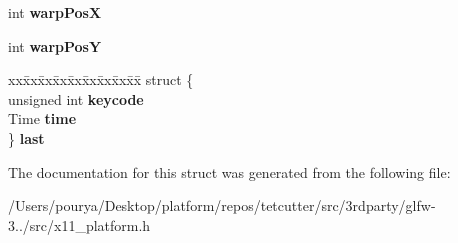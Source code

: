 \begin{DoxyCompactItemize}
\item 
\hypertarget{struct__GLFWwindowX11_ae60bc41921e99dff7972399167d6e5c0}{}int {\bfseries warp\+Pos\+X}\label{struct__GLFWwindowX11_ae60bc41921e99dff7972399167d6e5c0}

\item 
\hypertarget{struct__GLFWwindowX11_a84e134912363d97720a6c5a47a5b86e7}{}int {\bfseries warp\+Pos\+Y}\label{struct__GLFWwindowX11_a84e134912363d97720a6c5a47a5b86e7}

\item 
\hypertarget{struct__GLFWwindowX11_a8c1233585bb057a1072455be6bc9b3ea}{}\begin{tabbing}
xx\=xx\=xx\=xx\=xx\=xx\=xx\=xx\=xx\=\kill
struct \{\\
\>unsigned int {\bfseries keycode}\\
\>Time {\bfseries time}\\
\} {\bfseries last}\label{struct__GLFWwindowX11_a8c1233585bb057a1072455be6bc9b3ea}
\\

\end{tabbing}\end{DoxyCompactItemize}


The documentation for this struct was generated from the following file\+:\begin{DoxyCompactItemize}
\item 
/\+Users/pourya/\+Desktop/platform/repos/tetcutter/src/3rdparty/glfw-\/3../src/x11\+\_\+platform.\+h\end{DoxyCompactItemize}
